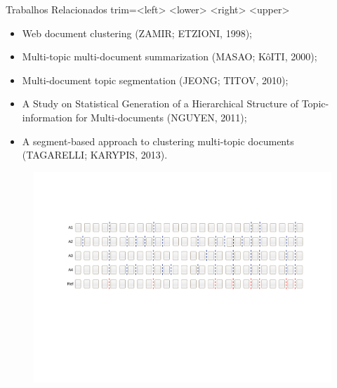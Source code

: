 \begin{frame}{Trabalhos Relacionados}
trim={<left> <lower> <right> <upper>}
























		\begin{itemize}
			\item Web document clustering (ZAMIR; ETZIONI, 1998); 
			\item Multi-topic multi-document summarization  (MASAO; KôITI, 2000); 
			\item Multi-document topic segmentation (JEONG; TITOV, 2010); 
			\item A Study on Statistical Generation of a Hierarchical Structure of Topic-information for Multi-documents (NGUYEN, 2011); 
			\item A segment-based approach to clustering multi-topic documents (TAGARELLI; KARYPIS, 2013).

		\end{itemize}








  \begin{center}
	\begin{figure}[h!]

	\includegraphics[trim={ 95 255 75 140 },clip,page=1,width=\textwidth]{images/segmentacao-referencia.pdf}


\end{figure}
\end{center}
\end{frame}
